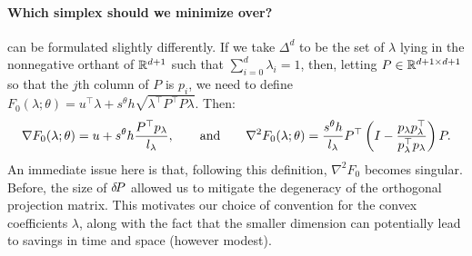 \documentclass[eikonal.tex]{subfiles}
\begin{document}
\paragraph{Which simplex should we minimize over?}
 can be formulated
slightly differently. If we take $\Delta^d$ to be the set of $\lambda$
lying in the nonnegative orthant of $\mathbb{R}^{d+1}$ such that
$\sum_{i=0}^d \lambda_i = 1$, then, letting
$P \in \mathbb{R}^{d + 1 \times d + 1}$ so that the $j$th column of $P$ is
$p_i$, we need to define
$F_0(\lambda; \theta) = u^\top \lambda + s^{\theta} h \sqrt{\lambda^\top
  P^\top P \lambda}$. Then:
\begin{equation*}
  \nabla F_0(\lambda; \theta) = u + s^{\theta} h \frac{P^\top p_\lambda}{l_\lambda}, \qquad \text{and} \qquad \nabla^2 F_0(\lambda; \theta) = \frac{s^{\theta} h}{l_\lambda} P^\top \left(I - \frac{p_\lambda p_\lambda^\top}{p_\lambda^\top p_\lambda}\right) P.
\end{equation*}
An immediate issue here is that, following this definition,
$\nabla^2 F_0$ becomes singular. Before, the size of ${\delta \hspace{-0.14em} P}$
allowed us to mitigate the degeneracy of the orthogonal projection
matrix. This motivates our choice of convention for the convex
coefficients $\lambda$, along with the fact that the smaller dimension
can potentially lead to savings in time and space (however modest).
\end{document}
